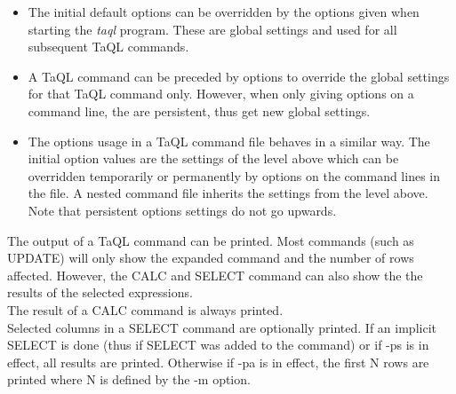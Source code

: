   \begin{itemize}
  \item The initial default options can be overridden by the options
    given when starting the {\em taql} program. These are global 
    settings and used for all subsequent TaQL commands.
  \item A TaQL command can be preceded by options to override the
    global settings for that TaQL command only. However, when only
    giving options on a command line, the are persistent, thus get
    new global settings.
  \item The options usage in a TaQL command file behaves in a similar
    way. The initial option values are the settings of the level above
    which can be overridden temporarily or permanently by options on
    the command lines in the file. A nested command file inherits the
    settings from the level above. Note that persistent options
    settings do not go upwards. 
  \end{itemize}

  The output of a TaQL command can be printed. Most commands (such as
  UPDATE) will only show  the expanded command and the number of rows
  affected. However, the CALC and SELECT command can also show the
  the results of the selected expressions.
  \\The result of a CALC command is always printed.
  \\Selected columns in a SELECT command are optionally printed. If an
  implicit SELECT is done (thus if SELECT was added to the command) or
  if -ps is in effect, all results are printed. Otherwise if -pa is in effect, the
  first N rows are printed where N is defined by the -m option.

